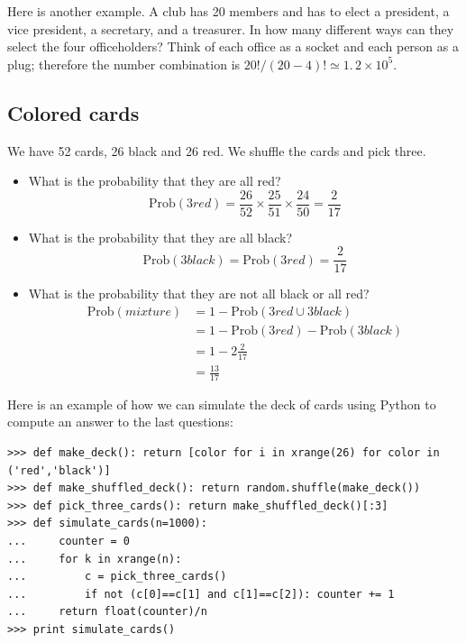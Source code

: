 \documentclass[justified,sixbynine]{tufte-book}
\def\ft{\small\tt}
\theoremstyle{plain}%
\theoremstyle{definition}
\theoremstyle{remark}
\begin{document}
\begin{fullwidth}
Here is another example. A club has 20 members and has to elect a president, a vice president,
a secretary, and a treasurer. In how many different ways can they select the
four officeholders? Think of each office as a socket and each person as a
plug; therefore the number combination is $20!/(20-4)!\simeq \allowbreak
1.\,2\times 10^5$.

\goodbreak\subsection{Colored cards}

We have 52 cards, 26 black and 26 red. We shuffle the cards and pick three.

\begin{itemize}
\item  What is the probability that they are all red?
\begin{equation}
\textrm{Prob}(3red)=\frac{26}{52}\times \frac{25}{51}\times \frac{24}{50}=\frac{2}{17}
\end{equation}

\item  What is the probability that they are all black?
\begin{equation}
\textrm{Prob}(3black)=\textrm{Prob}(3red)=\frac{2}{17}
\end{equation}

\item  What is the probability that they are not all black or all red?
\begin{align}
\textrm{Prob}(mixture) &= 1-\textrm{Prob}(3red\cup 3black) \\
&= 1-\textrm{Prob}(3red)-\textrm{Prob}(3black) \\
&= 1-2\frac{2}{17} \\
&= \frac{13}{17}
\end{align}
\end{itemize}

Here is an example of how we can simulate the deck of cards using Python to compute an answer to the last questions:

\begin{lstlisting}[caption={in file: {\ft tests.py}}]
>>> def make_deck(): return [color for i in xrange(26) for color in ('red','black')]
>>> def make_shuffled_deck(): return random.shuffle(make_deck())
>>> def pick_three_cards(): return make_shuffled_deck()[:3]
>>> def simulate_cards(n=1000):
...     counter = 0
...     for k in xrange(n):
...         c = pick_three_cards()
...         if not (c[0]==c[1] and c[1]==c[2]): counter += 1
...     return float(counter)/n
>>> print simulate_cards()
\end{lstlisting}


\end{fullwidth}
\end{document}
